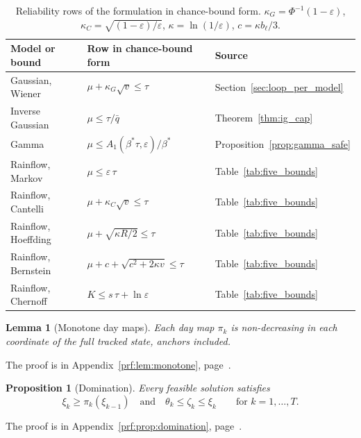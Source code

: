 \documentclass[11pt,a4paper]{article}
\theoremstyle{plain}
\newtheorem{proposition}[theorem]{Proposition}
\newtheorem{lemma}[theorem]{Lemma}
\theoremstyle{definition}
\theoremstyle{remark}
\begin{document}
\begin{table}[htbp]
\centering
\caption{Reliability rows of the formulation in chance-bound form.
$\kappa_G = \Phi^{-1}(1-\varepsilon)$, $\kappa_C = \sqrt{(1-\varepsilon)/\varepsilon}$, $\kappa = \ln(1/\varepsilon)$, $c = \kappa b_\ell/3$.}
\label{tab:chance_rows}
\small
\begin{tabular}{@{}lll@{}}
\toprule
\rowcolor{headgrey}
\textbf{Model or bound} & \textbf{Row in chance-bound form} & \textbf{Source} \\
\midrule
Gaussian, Wiener      & $\mu + \kappa_G\sqrt{v} \le \tau$ & Section~\ref{sec:loop_per_model} \\
Inverse Gaussian      & $\mu \le \tau/\bar q$ & Theorem~\ref{thm:ig_cap} \\
Gamma                 & $\mu \le A_1(\beta^*\tau,\varepsilon)/\beta^*$ & Proposition~\ref{prop:gamma_safe} \\
Rainflow, Markov      & $\mu \le \varepsilon\,\tau$ & Table~\ref{tab:five_bounds} \\
Rainflow, Cantelli    & $\mu + \kappa_C\sqrt{v} \le \tau$ & Table~\ref{tab:five_bounds} \\
Rainflow, Hoeffding   & $\mu + \sqrt{\kappa R/2} \le \tau$ & Table~\ref{tab:five_bounds} \\
Rainflow, Bernstein   & $\mu + c + \sqrt{c^2 + 2\kappa v} \le \tau$ & Table~\ref{tab:five_bounds} \\
Rainflow, Chernoff    & $K \le s\,\tau + \ln\varepsilon$ & Table~\ref{tab:five_bounds} \\
\bottomrule
\end{tabular}
\end{table}

\begin{lemma}[Monotone day maps]\label{lem:monotone}
Each day map $\pi_k$ is non-decreasing in each coordinate of the full tracked state, anchors included.
\end{lemma}
The proof is in Appendix~\ref{prf:lem:monotone}, page~\pageref{prf:lem:monotone}.

\begin{proposition}[Domination]\label{prop:domination}
Every feasible solution satisfies
\begin{equation}
  \xi_k \ge \pi_k(\xi_{k-1}) \quad\text{and}\quad \theta_k \le \zeta_k \le \xi_k \qquad \text{for } k = 1, \ldots, T.
\end{equation}
\end{proposition}
The proof is in Appendix~\ref{prf:prop:domination}, page~\pageref{prf:prop:domination}.
\end{document}
